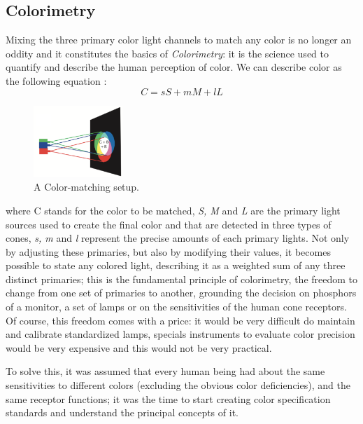 \documentclass{report}
\begin{document}
\subsection{Colorimetry}
Mixing the three primary color light channels to match any color is no longer an oddity and it constitutes
the basics of \emph{Colorimetry}: it is the science used to quantify and describe the human perception of color.
We can describe color as the following equation \cite{Ware2012}:
\begin{equation}
C = sS + mM + lL
\end{equation}
%
\begin{figure}
	\centering
    \includegraphics[width=0.3\textwidth]{Trichromacy.png}
	\caption[Trichromacy Theory]{A Color-matching setup. \cite{Ware2012}}
\end{figure}
%
where C stands for the color to be matched, \emph{S, M} and \emph{L} are the primary light sources used to create the final
color and that are detected in three types of cones, \emph{s, m} and \emph{l} represent the precise amounts of each primary
lights. Not only by adjusting these primaries, but also by modifying their values, it becomes possible to
state any colored light, describing it as a weighted
sum of any three distinct primaries; this is the fundamental principle of colorimetry, the freedom to change from
one set of primaries to another, grounding the decision on phosphors of a monitor, a set of lamps or on the
sensitivities of the human cone receptors. Of course, this freedom comes with a price: it would be very difficult
do maintain and calibrate standardized lamps, specials instruments to evaluate color precision would be very
expensive and this would not be very practical. \par
To solve this, it was assumed that every human being had about the
same sensitivities to different colors (excluding the obvious color deficiencies), and the same receptor functions;
it was the time to start creating color specification standards and understand the principal concepts of it.
%
\end{document}
